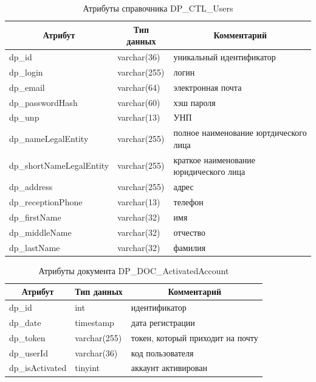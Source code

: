 \begin{table}[p]
    \centering\small

    \caption{Атрибуты справочника DP\_CTL\_Users}
    \label{tab:DP_CTL_Users}
    
    \begin{tabular}{|p{5cm}|p{2.5cm}|p{9cm}|}
        \hline
        \multicolumn{1}{|c|}{Атрибут}
        & \multicolumn{1}{c|}{Тип данных}
        & \multicolumn{1}{c|}{Комментарий}
        \\ \hline

        dp\_id & varchar(36) & уникальный идентификатор \\ \hline
        dp\_login & varchar(255) & логин \\ \hline
        dp\_email & varchar(64) & электронная почта \\ \hline
        dp\_passwordHash & varchar(60) & хэш пароля \\ \hline
        dp\_unp & varchar(13) & УНП \\ \hline
        dp\_nameLegalEntity & varchar(255) & полное наименование юртдического лица \\ \hline
        dp\_shortNameLegalEntity & varchar(255) & краткое наименование юридического лица \\ \hline
        dp\_address & varchar(255) & адрес \\ \hline
        dp\_receptionPhone & varchar(13) & телефон \\ \hline
        dp\_firstName & varchar(32) & имя \\ \hline
        dp\_middleName & varchar(32) & отчество \\ \hline
        dp\_lastName & varchar(32) & фамилия \\ \hline
    \end{tabular}
\end{table}

\begin{table}[p]
    \centering\small

    \caption{Атрибуты документа DP\_DOC\_ActivatedAccount}
    \label{tab:DP_DOC_ActivatedAccount}
    
    \begin{tabular}{|p{5cm}|p{2.5cm}|p{9cm}|}
        \hline
        \multicolumn{1}{|c|}{Атрибут}
        & \multicolumn{1}{c|}{Тип данных}
        & \multicolumn{1}{c|}{Комментарий}
        \\ \hline

        dp\_id & int & идентификатор \\ \hline
        dp\_date & timestamp & дата регистрации \\ \hline
        dp\_token & varchar(255) & токен, который приходит на почту \\ \hline
        dp\_userId & varchar(36) & код пользователя \\ \hline
        dp\_isActivated & tinyint & аккаунт активирован \\ \hline
    \end{tabular}
\end{table}

